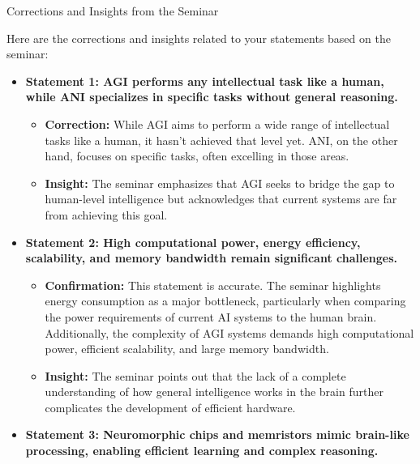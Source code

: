 \documentclass[
]{article}
\author{}
\date{}
\begin{document}
{Corrections and Insights from the
Seminar}\label{corrections-and-insights-from-the-seminar}

Here are the corrections and insights related to your statements based
on the seminar:

\begin{itemize}
\item
  \textbf{Statement 1: AGI performs any intellectual task like a human,
  while ANI specializes in specific tasks without general reasoning.}

  \begin{itemize}
  
  \item
    \textbf{Correction:} While AGI aims to perform a wide range of
    intellectual tasks like a human, it hasn't achieved that level yet.
    ANI, on the other hand, focuses on specific tasks, often excelling
    in those areas.
  \item
    \textbf{Insight:} The seminar emphasizes that AGI seeks to bridge
    the gap to human-level intelligence but acknowledges that current
    systems are far from achieving this goal.
  \end{itemize}
\item
  \textbf{Statement 2: High computational power, energy efficiency,
  scalability, and memory bandwidth remain significant challenges.}

  \begin{itemize}
  
  \item
    \textbf{Confirmation:} This statement is accurate. The seminar
    highlights energy consumption as a major bottleneck, particularly
    when comparing the power requirements of current AI systems to the
    human brain. Additionally, the complexity of AGI systems demands
    high computational power, efficient scalability, and large memory
    bandwidth.
  \item
    \textbf{Insight:} The seminar points out that the lack of a complete
    understanding of how general intelligence works in the brain further
    complicates the development of efficient hardware.
  \end{itemize}
\item
  \textbf{Statement 3: Neuromorphic chips and memristors mimic
  brain-like processing, enabling efficient learning and complex
  reasoning.}

  \begin{itemize}
  

\end{itemize}
\end{itemize}
\end{document}
